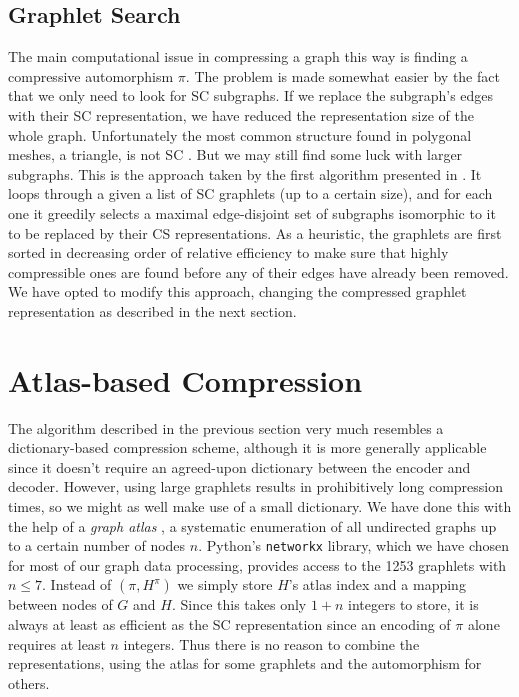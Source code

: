 \documentclass{egpubl}
\begin{document}
\subsection{Graphlet Search} \label{sec:graphlet}

The main computational issue in compressing a graph this way is finding a compressive automorphism $\pi$.
The problem is made somewhat easier by the fact that we only need to look for SC subgraphs. If we replace the subgraph's edges with their SC representation, we have reduced the representation size of the whole graph. 
Unfortunately the most common structure found in polygonal meshes, a triangle, is not SC \cite[Theorem 3]{cibej2021automorphisms}. But we may still find some luck with larger subgraphs.
This is the approach taken by the first algorithm presented in \cite{cibej2021automorphisms}.
It loops through a given a list of SC graphlets (up to a certain size),
and for each one it greedily selects a maximal edge-disjoint set of subgraphs isomorphic to it to be replaced by their CS representations.
As a heuristic, the graphlets are first sorted in decreasing order of relative efficiency to make sure that highly compressible ones are found before any of their edges have already been removed. We have opted to modify this approach, changing the compressed graphlet representation as described in the next section.

\section{Atlas-based Compression}

The algorithm described in the previous section very much resembles a dictionary-based compression scheme, although it is more generally applicable since it doesn't require an agreed-upon dictionary between the encoder and decoder. However, using large graphlets results in prohibitively long compression times, so we might as well make use of a small dictionary.
We have done this with the help of a \textit{graph atlas} \cite{read1998atlas}, a systematic enumeration of all undirected graphs up to a certain number of nodes $n$. Python's \texttt{networkx} library, which we have chosen for most of our graph data processing, provides access to the 1253 graphlets with $n \leq 7$.
Instead of $(\pi, H^\pi)$ we simply store $H$'s atlas index and a mapping between nodes of $G$ and $H$.
Since this takes only $1 + n$ integers to store, it is always at least as efficient as the SC representation since an encoding of $\pi$ alone requires at least $n$ integers.
Thus there is no reason to combine the representations, using the atlas for some graphlets and the automorphism for others.
\end{document}
